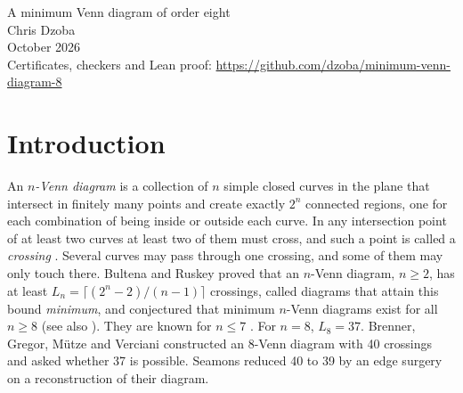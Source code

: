 \documentclass[11pt]{article}
\theoremstyle{remark}
\newcommand{\repo}{\url{https://github.com/dzoba/minimum-venn-diagram-8}}
\begin{document}
\begin{center}
{\LARGE A minimum Venn diagram of order eight}\\[10pt]
{\large Chris Dzoba}\\[4pt]
October 2026\\[2pt]
{\small Certificates, checkers and Lean proof: \repo}
\end{center}

\begin{abstract}
Bultena and Ruskey proved in 1998 that an $n$-Venn diagram has at least $L_n=\lceil(2^n-2)/(n-1)\rceil$ crossings
and conjectured that the bound is attained for every $n\ge 8$. We give an $8$-Venn diagram with $37=L_8$ crossings,
which settles the case $n=8$ and answers a question of Brenner, Gregor, M\"utze and Verciani; the best known before
had 39 crossings (Seamons). Its 37 crossings are listed in an appendix, and it has been checked by three separately
written programs (see the section on the use of AI tools) and in Lean~4. It has a half-turn symmetry, and in every
$8$-Venn diagram with 37 crossings a finite group of orientation-preserving symmetries has order at most 2.
Doubling gives a $9$-Venn diagram with 74 crossings, optimal among those in which some curve meets every other curve
exactly twice, and a two-tube doubling of the two known 37-crossing diagrams gives one with 73 crossings.
\end{abstract}

\section{Introduction}

An \emph{$n$-Venn diagram} is a collection of $n$ simple closed curves in the plane that intersect in finitely many
points and create exactly $2^n$ connected regions, one for each combination of being inside or outside each curve.
In any intersection point of at least two curves at least two of them must cross, and such a point is called a
\emph{crossing} \cite{BGMV}. Several curves may pass through one crossing, and some of them may only touch there.
Bultena and Ruskey \cite{BR98} proved that an $n$-Venn diagram, $n\ge2$, has at least
$L_n=\lceil(2^n-2)/(n-1)\rceil$ crossings, called diagrams that attain this bound \emph{minimum}, and conjectured
that minimum $n$-Venn diagrams exist for all $n\ge8$ (see also \cite{RW}). They are known for $n\le7$
\cite{BR98,BGMV}. For $n=8$, $L_8=37$. Brenner, Gregor, M\"utze and Verciani \cite{BGMV} constructed an $8$-Venn
diagram with 40 crossings and asked whether 37 is possible. Seamons \cite{Sea} reduced 40 to 39 by an edge surgery
on a reconstruction of their diagram.
\end{document}
